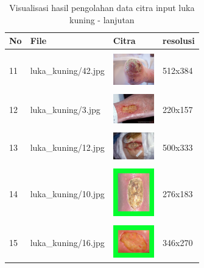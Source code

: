 \begin{table}[H]
	\centering
	\caption{Visualisasi hasil pengolahan data citra input luka kuning - lanjutan}
	\label{tabel_input_6}
	\begin{tabular}{|m{0.2in}|m{1.2in}|m{0.7in}|m{0.7in}|}
		\hline
		\textbf{No} & \textbf{File} & \textbf{Citra} & \textbf{resolusi} \\
		\hline
		
		& &  &  \\
		11& 
		luka\_kuning/42.jpg &
		\includegraphics[width=0.7in]{gambar/dataset_citra/luka_kuning/42.jpg}&
		512x384\\
		\hline
		
		& &  &  \\
		12& 
		luka\_kuning/3.jpg &
		\includegraphics[width=0.7in]{gambar/dataset_citra/luka_kuning/3.jpg}&
		220x157\\
		\hline
		
		& &  &  \\
		13& 
		luka\_kuning/12.jpg &
		\includegraphics[width=0.7in]{gambar/dataset_citra/luka_kuning/12.jpg}&
		500x333\\
		\hline
		
		& &  &  \\
		14& 
		luka\_kuning/10.jpg &
		\includegraphics[width=0.7in]{gambar/dataset_citra/luka_kuning/10.jpg}&
		276x183\\
		\hline
				
		& &  &  \\
		15 & 
		luka\_kuning/16.jpg &
		\includegraphics[width=0.7in]{gambar/dataset_citra/luka_kuning/16.jpg}&
		346x270\\
		\hline
	\end{tabular}
\end{table}


